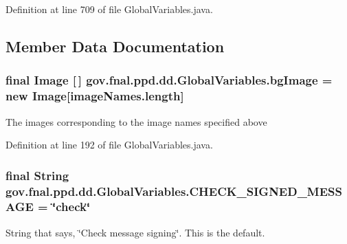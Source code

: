 Definition at line 709 of file Global\-Variables.\-java.



\subsection{Member Data Documentation}
\hypertarget{classgov_1_1fnal_1_1ppd_1_1dd_1_1GlobalVariables_a912d45efb46176a8ccd9ce8e046695b0}{
\subsubsection[{bg\-Image}]{\setlength{\rightskip}{0pt plus 5cm}final Image \mbox{[}$\,$\mbox{]} gov.\-fnal.\-ppd.\-dd.\-Global\-Variables.\-bg\-Image = new Image\mbox{[}image\-Names.\-length\mbox{]}\hspace{0.3cm}{\ttfamily [static]}}}\label{classgov_1_1fnal_1_1ppd_1_1dd_1_1GlobalVariables_a912d45efb46176a8ccd9ce8e046695b0}
The images corresponding to the image names specified above 

Definition at line 192 of file Global\-Variables.\-java.

\hypertarget{classgov_1_1fnal_1_1ppd_1_1dd_1_1GlobalVariables_a274f346ecbec974a9b47db2e5d1e0e8b}{
\subsubsection[{C\-H\-E\-C\-K\-\_\-\-S\-I\-G\-N\-E\-D\-\_\-\-M\-E\-S\-S\-A\-G\-E}]{\setlength{\rightskip}{0pt plus 5cm}final String gov.\-fnal.\-ppd.\-dd.\-Global\-Variables.\-C\-H\-E\-C\-K\-\_\-\-S\-I\-G\-N\-E\-D\-\_\-\-M\-E\-S\-S\-A\-G\-E = \char`\"{}check\char`\"{}\hspace{0.3cm}{\ttfamily [static]}}}\label{classgov_1_1fnal_1_1ppd_1_1dd_1_1GlobalVariables_a274f346ecbec974a9b47db2e5d1e0e8b}
String that says, \char`\"{}\-Check message signing\char`\"{}. This is the default. 

